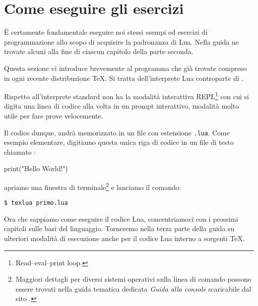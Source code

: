 

\chapter{Come eseguire gli esercizi}
\label{iiChEseguireEsercizi}

È certamente fondamentale eseguire noi stessi esempi ed esercizi di
programmazione allo scopo di acquisire la padronanza di Lua. Nella guida ne
trovate alcuni alla fine di ciascun capitolo della parte seconda. 

Questa sezione vi introduce brevemente al programma  che già
trovate compreso in ogni recente distribuzione \TeX{}. Si tratta dell'interprete
Lua controparte di .

Rispetto all'interprete  standard  non ha la modalità
interattiva REPL\footnote{Read–eval–print loop.} con cui si digita una linea di
codice alla volta in un prompt interattivo, modalità molto utile per fare prove
velocemente.

Il codice dunque, andrà memorizzato in un file con estensione \texttt{.lua}.
Come esempio elementare, digitiamo questa unica riga di codice in un file
di testo chiamato :
\begin{lines}
print("Hello World!")
\end{lines}
apriamo una finestra di terminale\footnote{Maggiori dettagli per diversi sistemi
operativi sulla linea di comando possono essere trovati nella guida tematica
dedicata \emph{Guida alla console} scaricabile dal sito \GuIT.} e lanciamo il
comando:
\begin{Verbatim}[numbers=none,xleftmargin=0pt]
$ texlua primo.lua
\end{Verbatim}

Ora che sappiamo come eseguire il codice Lua, concentriamoci con i prossimi
capitoli sulle basi del linguaggio. Torneremo nella terza parte della guida su
ulteriori modalità di esecuzione anche per il codice Lua interno a sorgenti
\TeX.


